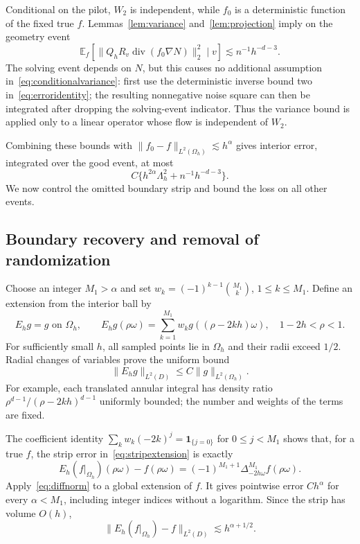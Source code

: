 \documentclass[11pt]{article}
\theoremstyle{remark}
\newcommand{\E}{\mathbb E}
\newcommand{\diver}{\operatorname{div}}
\newcommand{\norm}[1]{\lVert #1\rVert}
\begin{document}
Conditional on the pilot, $W_2$ is independent, while $f_0$ is a deterministic function of the fixed true $f$. Lemmas~\ref{lem:variance} and~\ref{lem:projection} imply on the geometry event
\begin{equation}\label{eq:conditionalvariance}
 \E_f\left[\norm{Q_hR_v\diver(f_0\nabla N)}_2^2\mid v\right]
 \lesssim n^{-1}h^{-d-3}.
\end{equation}
The solving event depends on $N$, but this causes no additional assumption in~\eqref{eq:conditionalvariance}: first use the deterministic inverse bound two in~\eqref{eq:erroridentity}; the resulting nonnegative noise square can then be integrated after dropping the solving-event indicator. Thus the variance bound is applied only to a linear operator whose flow is independent of $W_2$.

Combining these bounds with $\norm{f_0-f}_{L^2(\Omega_h)}\lesssim h^\alpha$ gives interior error, integrated over the good event, at most
\begin{equation}\label{eq:interiorrisk}
 C\{h^{2\alpha}\Lambda_h^2+n^{-1}h^{-d-3}\}.
\end{equation}
We now control the omitted boundary strip and bound the loss on all other events.

\subsection{Boundary recovery and removal of randomization}
Choose an integer $M_1>\alpha$ and set
$w_k=(-1)^{k-1}\binom{M_1}{k}$, $1\le k\le M_1$. Define an extension from the interior ball by
\begin{equation}\label{eq:stripextension}
 E_hg=g\text{ on }\Omega_h,\qquad
 E_hg(\rho\omega)=\sum_{k=1}^{M_1}w_kg((\rho-2kh)\omega),
 \quad1-2h<\rho<1.
\end{equation}
For sufficiently small $h$, all sampled points lie in $\Omega_h$ and their radii exceed $1/2$. Radial changes of variables prove the uniform bound
\begin{equation}\label{eq:stripL2}
 \norm{E_hg}_{L^2(D)}\le C\norm g_{L^2(\Omega_h)}.
\end{equation}
For example, each translated annular integral has density ratio
$\rho^{d-1}/(\rho-2kh)^{d-1}$ uniformly bounded; the number and weights of the terms are fixed.

The coefficient identity
$\sum_kw_k(-2k)^j=\mathbf1_{\{j=0\}}$ for $0\le j<M_1$
shows that, for a true $f$, the strip error in~\eqref{eq:stripextension} is exactly
\[
 E_h(f|_{\Omega_h})(\rho\omega)-f(\rho\omega)
 =(-1)^{M_1+1}\Delta_{-2h\omega}^{M_1}f(\rho\omega).
\]
Apply~\eqref{eq:diffnorm} to a global extension of $f$. It gives pointwise error $Ch^\alpha$ for every $\alpha<M_1$, including integer indices without a logarithm. Since the strip has volume $O(h)$,
\begin{equation}\label{eq:stripbias}
 \norm{E_h(f|_{\Omega_h})-f}_{L^2(D)}\lesssim h^{\alpha+1/2}.
\end{equation}
\end{document}
